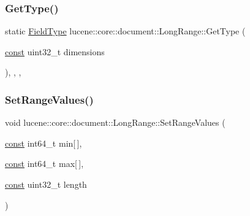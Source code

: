 \subsubsection{\texorpdfstring{Get\+Type()}{GetType()}}
{\footnotesize\ttfamily static \mbox{\hyperlink{classlucene_1_1core_1_1document_1_1FieldType}{Field\+Type}} lucene\+::core\+::document\+::\+Long\+Range\+::\+Get\+Type (\begin{DoxyParamCaption}\item[{\mbox{\hyperlink{ZlibCrc32_8h_a2c212835823e3c54a8ab6d95c652660e}{const}} uint32\+\_\+t}]{dimensions }\end{DoxyParamCaption})\hspace{0.3cm}{\ttfamily [inline]}, {\ttfamily [static]}, {\ttfamily [private]}, {\ttfamily [noexcept]}}

\mbox{\label{classlucene_1_1core_1_1document_1_1LongRange_a2ddad3123f8537aa9958f0e61052aa2a}} 
\subsubsection{\texorpdfstring{Set\+Range\+Values()}{SetRangeValues()}}
{\footnotesize\ttfamily void lucene\+::core\+::document\+::\+Long\+Range\+::\+Set\+Range\+Values (\begin{DoxyParamCaption}\item[{\mbox{\hyperlink{ZlibCrc32_8h_a2c212835823e3c54a8ab6d95c652660e}{const}} int64\+\_\+t}]{min\mbox{[}$\,$\mbox{]},  }\item[{\mbox{\hyperlink{ZlibCrc32_8h_a2c212835823e3c54a8ab6d95c652660e}{const}} int64\+\_\+t}]{max\mbox{[}$\,$\mbox{]},  }\item[{\mbox{\hyperlink{ZlibCrc32_8h_a2c212835823e3c54a8ab6d95c652660e}{const}} uint32\+\_\+t}]{length }\end{DoxyParamCaption})\hspace{0.3cm}{\ttfamily [inline]}}

\mbox{\label{classlucene_1_1core_1_1document_1_1LongRange_acc112551134a7e54e9480e3ef5dca2d0}} 
